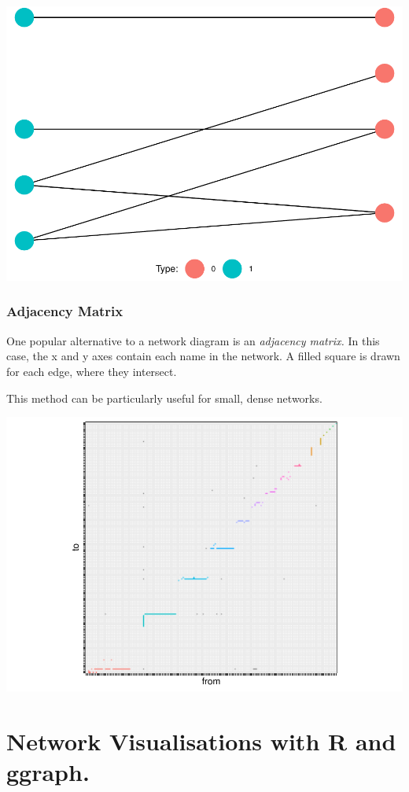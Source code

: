 \documentclass[
]{book}
\begin{document}
\includegraphics{_main_files/figure-latex/unnamed-chunk-55-1.pdf}

\hypertarget{adjacency-matrix}{%
\subsubsection{Adjacency Matrix}\label{adjacency-matrix}}

One popular alternative to a network diagram is an \emph{adjacency matrix.} In this case, the x and y axes contain each name in the network. A filled square is drawn for each edge, where they intersect.

This method can be particularly useful for small, dense networks.

\includegraphics{_main_files/figure-latex/unnamed-chunk-56-1.pdf}

\hypertarget{network-visualisations-with-r-and-ggraph.}{%
\section{Network Visualisations with R and ggraph.}\label{network-visualisations-with-r-and-ggraph.}}
\end{document}
